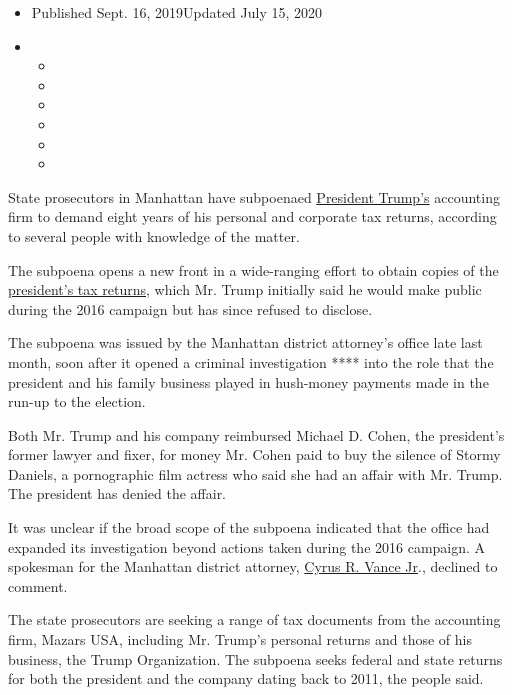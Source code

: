 \begin{itemize}
\item
  Published Sept. 16, 2019Updated July 15, 2020
\item
  \begin{itemize}
  \item
  \item
  \item
  \item
  \item
  \item
  \end{itemize}
\end{itemize}

State prosecutors in Manhattan have subpoenaed
\href{https://www.nytimes3xbfgragh.onion/2020/07/10/nyregion/donald-trump-taxes-cy-vance.html}{President
Trump's} accounting firm to demand eight years of his personal and
corporate tax returns, according to several people with knowledge of the
matter.

The subpoena opens a new front in a wide-ranging effort to obtain copies
of the
\href{https://www.nytimes3xbfgragh.onion/2020/07/15/nyregion/donald-trump-taxes-cyrus-vance.html}{president's
tax returns}, which Mr. Trump initially said he would make public during
the 2016 campaign but has since refused to disclose.

The subpoena was issued by the Manhattan district attorney's office late
last month, soon after it opened a criminal investigation **** into the
role that the president and his family business played in hush-money
payments made in the run-up to the election.

Both Mr. Trump and his company reimbursed Michael D. Cohen, the
president's former lawyer and fixer, for money Mr. Cohen paid to buy the
silence of Stormy Daniels, a pornographic film actress who said she had
an affair with Mr. Trump. The president has denied the affair.

It was unclear if the broad scope of the subpoena indicated that the
office had expanded its investigation beyond actions taken during the
2016 campaign. A spokesman for the Manhattan district attorney,
\href{https://www.nytimes3xbfgragh.onion/2020/07/10/nyregion/donald-trump-taxes-cy-vance.html}{Cyrus
R. Vance Jr}., declined to comment.

The state prosecutors are seeking a range of tax documents from the
accounting firm, Mazars USA, including Mr. Trump's personal returns and
those of his business, the Trump Organization. The subpoena seeks
federal and state returns for both the president and the company dating
back to 2011, the people said.

